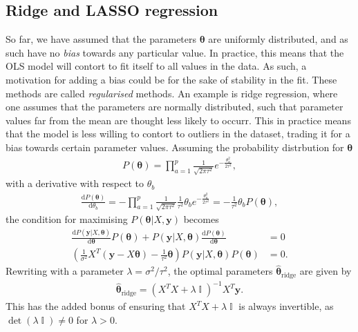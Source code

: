 \documentclass[twocolumn,english,notitlepage]{article}
\renewcommand{\d}[2][x]{\ensuremath{\frac{\mathrm{d}#2}{\mathrm{d}#1}}}
\renewcommand{\vec}[1]{\boldsymbol{#1}}
\newcommand{\pclosed}[1]{\left(#1\right)}
\renewcommand{\exp}[1]{e^{#1}}
\DeclareMathOperator{\eye}{\mathbb{I}}
\newcommand{\msub}[2]{\ensuremath{{#1}_\text{#2}}}
\begin{document}
        \subsection{Ridge and LASSO regression}
            So far, we have assumed that the parameters $\vec{\theta}$ are uniformly distributed, and as such have no \textit{bias} towards any particular value. In practice, this means that the OLS model will contort to fit itself to all values in the data. As such, a motivation for adding a bias could be for the sake of stability in the fit. These methods are called \textit{regularised} methods. An example is ridge regression, where one assumes that the parameters are normally distributed, such that parameter values far from the mean are thought less likely to occurr. This in practice means that the model is less willing to contort to outliers in the dataset, trading it for a bias towards certain parameter values. Assuming the probability distrbution for $\vec{\theta}$
            \begin{align}
                P(\vec{\theta}) = \prod_{a=1}^{p} \frac{1}{\sqrt{2\pi\tau^2}} \exp{-\frac{\theta_a^2}{2\tau^2}},
            \end{align}
            with a derivative with respect to $\theta_b$
            \begin{align}
                \d[\theta_b]{P(\vec{\theta})} = -\prod_{a=1}^{p} \frac{1}{\sqrt{2\pi\tau^2}} \frac{1}{\tau^2} \theta_b \exp{-\frac{\theta_a^2}{2\tau^2}} = -\frac{1}{\tau^2} \theta_b P(\vec{\theta}),
            \end{align}
            the condition for maximising $P(\vec{\theta}|X, \vec{y})$ becomes
            \begin{align} \nonumber
                \d[\vec{\theta}]{P(\vec{y}|X, \vec{\theta})} P(\vec{\theta}) + P(\vec{y}|X, \vec{\theta}) \d[\vec{\theta}]{P(\vec{\theta})} &= 0 \\
                \pclosed{ \frac{1}{\sigma^2} X^T(\vec{y}-X\vec{\theta}) - \frac{1}{\tau^2} \vec{\theta} } P(\vec{y}|X,\vec{\theta}) P(\vec{\theta}) &= 0.
            \end{align}
            Rewriting with a parameter $\lambda = \sigma^2/\tau^2$, the optimal parameters $\msub{\vec{\hat{\theta}}}{ridge}$ are given by
            \begin{align}
                \boxed{
                \msub{\vec{\hat{\theta}}}{ridge} = \pclosed{X^TX + \lambda \eye}^{-1} X^T \vec{y}.
                }
            \end{align}
            This has the added bonus of ensuring that $X^TX + \lambda \eye$ is always invertible, as $\det(\lambda \eye) \neq 0$ for $\lambda>0$.
\end{document}
